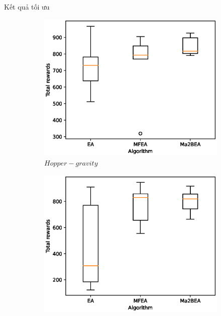     \begin{frame}{Kết quả tối ưu}
        \begin{figure}[hp]
            \centering
            \begin{subfigure}[b]{0.49\linewidth}
                \includegraphics[width=\linewidth]{figure/experiment/mujoco/hopper-gravity.eps}
                \caption{$Hopper-gravity$}
                \label{fig:result:mujoco:sphere}
            \end{subfigure}
            \hfill
            \begin{subfigure}[b]{0.49\linewidth}
                \includegraphics[width=\linewidth]{figure/experiment/mujoco/hopper-size.eps}

\end{subfigure}
\end{figure}
\end{frame}
